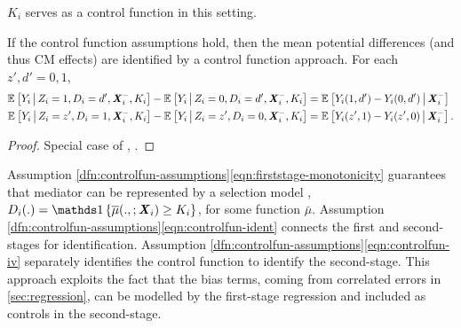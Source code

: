 $K_{i}$ serves as a control function in this setting.
\begin{theorem}
    \label{thm:controlfun}
    If the control function assumptions hold,
    then the mean potential differences
    (and thus CM effects)
    are identified by a control function approach.
    For each $z', d' = 0,1$,
    \begin{align*}
        \mathbb{E}_{} \left[ Y_i \, \middle\vert \, Z_i = 1, D_i = d', \boldsymbol{\mathit{X}}_i^-, K_{i} \right]
        - \mathbb{E}_{} \left[ Y_i \, \middle\vert \, Z_i = 0, D_i = d', \boldsymbol{\mathit{X}}_i^-, K_{i} \right] 
        &= \mathbb{E}_{} \left[ Y_i(1, d') - Y_i(0, d') \, \middle\vert \, \boldsymbol{\mathit{X}}_i^- \right] \\
        \mathbb{E}_{} \left[ Y_i \, \middle\vert \, Z_i = z', D_i = 1, \boldsymbol{\mathit{X}}_i^-, K_{i} \right]
        - \mathbb{E}_{} \left[ Y_i \, \middle\vert \, Z_i = z', D_i = 0, \boldsymbol{\mathit{X}}_i^-, K_{i} \right] 
        &= \mathbb{E}_{} \left[ Y_i(z', 1) - Y_i(z', 0) \, \middle\vert \, \boldsymbol{\mathit{X}}_i^- \right].
    \end{align*}
\end{theorem}
\begin{proof}
    Special case of \citet[Theorem~1]{florens2008identification}, \citet[Theorem~3]{imbens2009identification}.
\end{proof}

Assumption \ref{dfn:controlfun-assumptions}\eqref{eqn:firststage-monotonicity} guarantees that mediator can be represented by a selection model \citep{vytlacil2002independence}, $D_i(.) = \indicator{\bar\mu(.,;\vec X_i) \geq K_i}$, for some function $\bar\mu$.
Assumption \ref{dfn:controlfun-assumptions}\eqref{eqn:controlfun-ident} connects the first and second-stages for identification.
Assumption \ref{dfn:controlfun-assumptions}\eqref{eqn:controlfun-iv} separately identifies the control function to identify the second-stage.
This approach exploits the fact that the bias terms, coming from correlated errors in \autoref{sec:regression}, can be modelled by the first-stage regression and included as controls in the second-stage.

